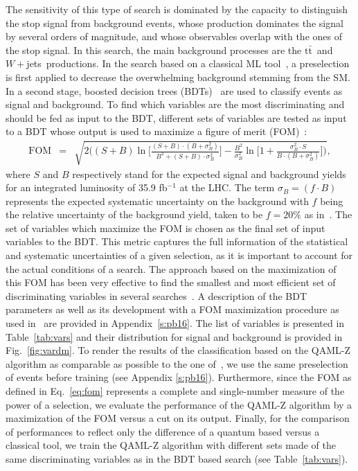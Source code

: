 \documentclass{article}
\newcommand{\wjets}{\ensuremath{W+}jets~}
\newcommand{\ttbar}{\ensuremath{\mathrm{t}\bar{\mathrm{t}}}~}
\begin{document}
The sensitivity of this type of search is dominated by the capacity to 
distinguish the stop signal from background events, whose production 
dominates the signal by several orders of magnitude, and whose observables 
overlap with the ones of the stop signal. In this search, the main 
background processes are the \ttbar and \wjets productions. In the search 
based on a classical ML tool~\cite{st4bd}, a preselection is first 
applied to decrease the overwhelming background stemming from the SM. In a 
second stage, boosted decision trees (BDTs)~\cite{RefBDT,tmva} are used to 
classify events as signal and background. To find which variables are the 
most discriminating and should be fed as input to the BDT, different sets 
of variables are tested as input to a BDT whose output is used to maximize 
a figure of merit (FOM)~\cite{fom}:
\begin{eqnarray}
  \mathrm{FOM} & = & \sqrt{ 2 \Big( (S+B)\ln\Big[\frac{(S+B)\cdot(B+\sigma_B^2)}{B^2 + (S+B)\cdot\sigma_B^2}\Big] 
    - \frac{B^2}{\sigma_B^2}\ln\Big[1 + \frac{\sigma_B^2 \cdot S}{B \cdot (B+\sigma_B^2)}\Big] \Big) },
\label{eq:fom}
\end{eqnarray}
where $S$ and $B$ respectively stand for the expected signal and 
background yields for an integrated luminosity of 35.9 fb$^{-1}$ at the 
LHC. The term $\sigma_B = (f \cdot B)$ represents the expected systematic 
uncertainty on the background with $f$ being the relative uncertainty of 
the background yield, taken to be $f=20\%$ as in~\cite{st4bd}. The set of 
variables which maximize the FOM is chosen as the final set of input
variables to the BDT. This metric captures the full information of the 
statistical and systematic uncertainties of a given selection, as it is
important to account for the actual conditions of a search.
The approach based on the maximization of this FOM has been very effective
to find the smallest and most efficient set of discriminating variables
in several searches~\cite{st4bd,st8tev}. A description of the BDT parameters
as well as its development with a FOM maximization procedure as used
in~\cite{st4bd} are provided in Appendix~\ref{s:pb16}. The list of variables
is presented in Table~\ref{tab:vars} and their distribution for signal and
background is provided in Fig.~\ref{fig:vardm}. To render the results of
the classification based on the QAML-Z algorithm as comparable as possible
to the one of~\cite{st4bd}, we use the same preselection of events before
training (see Appendix \ref{s:pb16}). Furthermore, since the FOM as defined
in Eq.~\ref{eq:fom} represents a complete and single-number measure of the
power of a selection, we evaluate the performance of the QAML-Z algorithm
by a maximization of the FOM versus a cut on its output. Finally, for the
comparison of performances to reflect only the difference of a quantum based
versus a classical tool, we train the QAML-Z algorithm with different sets 
made of the same discriminating variables as in the BDT based search 
\cite{st4bd} (see Table~\ref{tab:vars}).
\end{document}

